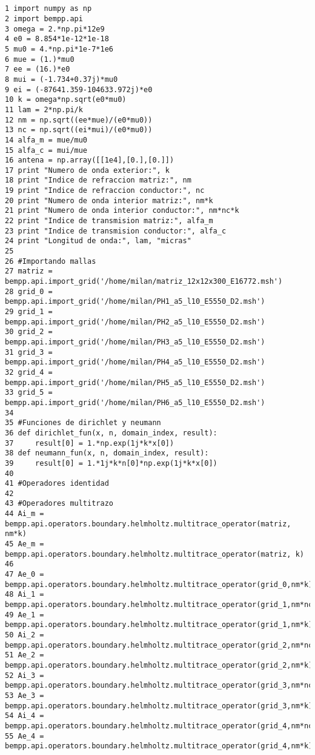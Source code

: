 \documentclass[12pt,letterpaper]{report}
\numberwithin{equation}{section}
\begin{document}
\begin{lstlisting}


1 import numpy as np
2 import bempp.api
3 omega = 2.*np.pi*12e9
4 e0 = 8.854*1e-12*1e-18
5 mu0 = 4.*np.pi*1e-7*1e6
6 mue = (1.)*mu0
7 ee = (16.)*e0
8 mui = (-1.734+0.37j)*mu0
9 ei = (-87641.359-104633.972j)*e0
10 k = omega*np.sqrt(e0*mu0)
11 lam = 2*np.pi/k
12 nm = np.sqrt((ee*mue)/(e0*mu0))
13 nc = np.sqrt((ei*mui)/(e0*mu0))
14 alfa_m = mue/mu0
15 alfa_c = mui/mue
16 antena = np.array([[1e4],[0.],[0.]])
17 print "Numero de onda exterior:", k
18 print "Indice de refraccion matriz:", nm
19 print "Indice de refraccion conductor:", nc
20 print "Numero de onda interior matriz:", nm*k
21 print "Numero de onda interior conductor:", nm*nc*k
22 print "Indice de transmision matriz:", alfa_m
23 print "Indice de transmision conductor:", alfa_c
24 print "Longitud de onda:", lam, "micras"
25 
26 #Importando mallas
27 matriz = bempp.api.import_grid('/home/milan/matriz_12x12x300_E16772.msh')
28 grid_0 = bempp.api.import_grid('/home/milan/PH1_a5_l10_E5550_D2.msh')
29 grid_1 = bempp.api.import_grid('/home/milan/PH2_a5_l10_E5550_D2.msh')
30 grid_2 = bempp.api.import_grid('/home/milan/PH3_a5_l10_E5550_D2.msh')
31 grid_3 = bempp.api.import_grid('/home/milan/PH4_a5_l10_E5550_D2.msh')
32 grid_4 = bempp.api.import_grid('/home/milan/PH5_a5_l10_E5550_D2.msh')
33 grid_5 = bempp.api.import_grid('/home/milan/PH6_a5_l10_E5550_D2.msh')
34 
35 #Funciones de dirichlet y neumann
36 def dirichlet_fun(x, n, domain_index, result):
37     result[0] = 1.*np.exp(1j*k*x[0])
38 def neumann_fun(x, n, domain_index, result):
39     result[0] = 1.*1j*k*n[0]*np.exp(1j*k*x[0])
40 
41 #Operadores identidad
42 
43 #Operadores multitrazo
44 Ai_m = bempp.api.operators.boundary.helmholtz.multitrace_operator(matriz, nm*k)
45 Ae_m = bempp.api.operators.boundary.helmholtz.multitrace_operator(matriz, k)
46 
47 Ae_0 = bempp.api.operators.boundary.helmholtz.multitrace_operator(grid_0,nm*k)
48 Ai_1 = bempp.api.operators.boundary.helmholtz.multitrace_operator(grid_1,nm*nc*k)
49 Ae_1 = bempp.api.operators.boundary.helmholtz.multitrace_operator(grid_1,nm*k)
50 Ai_2 = bempp.api.operators.boundary.helmholtz.multitrace_operator(grid_2,nm*nc*k)
51 Ae_2 = bempp.api.operators.boundary.helmholtz.multitrace_operator(grid_2,nm*k)
52 Ai_3 = bempp.api.operators.boundary.helmholtz.multitrace_operator(grid_3,nm*nc*k)
53 Ae_3 = bempp.api.operators.boundary.helmholtz.multitrace_operator(grid_3,nm*k)
54 Ai_4 = bempp.api.operators.boundary.helmholtz.multitrace_operator(grid_4,nm*nc*k)
55 Ae_4 = bempp.api.operators.boundary.helmholtz.multitrace_operator(grid_4,nm*k)

\end{lstlisting}
\end{document}
